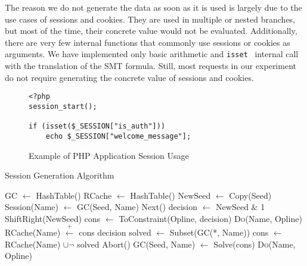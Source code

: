 \documentclass[10pt,conference]{IEEEtran}
\begin{document}
The reason we do not generate the data as soon as it is used is largely due to the use cases of sessions and cookies. They are used in multiple or nested branches, but most of the time, their concrete value would not be evaluated. Additionally, there are very few internal functions that commonly use sessions or cookies as arguments. We have implemented only basic arithmetic and \verb|isset|~\cite{isset} internal call with the translation of the SMT formula. Still, most requests in our experiment do not require generating the concrete value of sessions and cookies. %

\begin{figure} [t] \small
    \centering

\begin{lstlisting}
<?php
session_start();

if (isset($_SESSION["is_auth"]))
    echo $_SESSION["welcome_message"];

\end{lstlisting}
    \caption{Example of PHP Application Session Usage}
    \label{code: php session}

\end{figure}


\label{proc:session-imp}
\begin{algorithm} 
    \caption{Session Generation Algorithm}
    \begin{algorithmic}[1]
            \State GC $\leftarrow$ HashTable() 
        \EndProcedure
            \State RCache $\leftarrow$ HashTable()
            \State NewSeed $\leftarrow$ Copy(Seed)
        \EndProcedure
                \State Session(Name) $\leftarrow$ GC(Seed, Name)
                \State \Return Next()
            \EndIf
              \State decision $\leftarrow$ NewSeed \& 1 
              \State ShiftRight(NewSeed)
              \State cons $\leftarrow$ ToConstraint(Opline, decision)
                \State \Return \textsc{Do}(Name, Opline)
              \EndIf
              \State RCache(Name) $\overset{+}{\leftarrow}$ cons
              \State \Return decision
            \Else
              \State solved $\leftarrow$ Subset(GC(*, Name))
              \State cons $\leftarrow$ RCache(Name) $\cup \neg$ solved
               \Return Abort() 
              \EndIf
              \State GC(Seed, Name) $\leftarrow$ Solve(cons)
              \State \Return \textsc{Do}(Name, Opline)
            \EndIf
        \EndProcedure
    \end{algorithmic}
\end{algorithm}
\end{document}
